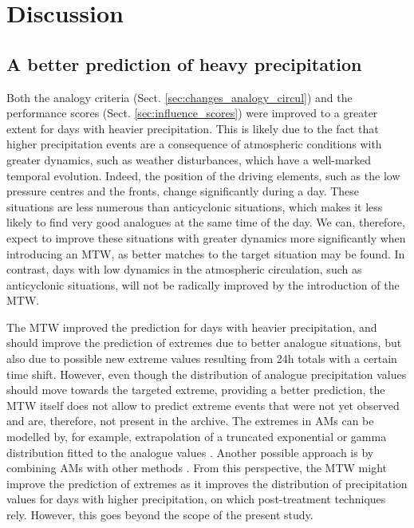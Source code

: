\documentclass[hess, manuscript]{copernicus}
\begin{document}
	\section{Discussion}
	\label{sec:discussion}

	\subsection{A better prediction of heavy precipitation}
	
	Both the analogy criteria (Sect. \ref{sec:changes_analogy_circul}) and the performance scores (Sect. \ref{sec:influence_scores}) were improved to a greater extent for days with heavier precipitation. This is likely due to the fact that higher precipitation events are a consequence of atmospheric conditions with greater dynamics, such as weather disturbances, which have a well-marked temporal evolution. Indeed, the position of the driving elements, such as the low pressure centres and the fronts, change significantly during a day. These situations are less numerous than anticyclonic situations, which makes it less likely to find very good analogues at the same time of the day. We can, therefore, expect to improve these situations with greater dynamics more significantly when introducing an MTW, as better matches to the target situation may be found. In contrast, days with low dynamics in the atmospheric circulation, such as anticyclonic situations, will not be radically improved by the introduction of the MTW.
	
	The MTW improved the prediction for days with heavier precipitation, and should improve the prediction of extremes due to better analogue situations, but also due to possible new extreme values resulting from 24h totals with a certain time shift. However, even though the distribution of analogue precipitation values should move towards the targeted extreme, providing a better prediction, the MTW itself does not allow to predict extreme events that were not yet observed and are, therefore, not present in the archive. The extremes in AMs can be modelled by, for example, extrapolation of a truncated exponential or gamma distribution fitted to the analogue values \citep{Obled2002}. Another possible approach is by combining AMs with other methods \citep[e.g.][]{Chardon2014}. From this perspective, the MTW might improve the prediction of extremes as it improves the distribution of precipitation values for days with higher precipitation, on which post-treatment techniques rely. However, this goes beyond the scope of the present study.
	
\end{document}
